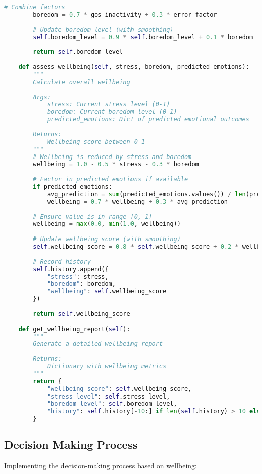 \documentclass[11pt,a4paper]{article}
\begin{document}
\begin{lstlisting}[language=Python]
        # Combine factors
        boredom = 0.7 * gos_inactivity + 0.3 * error_factor
        
        # Update boredom level (with smoothing)
        self.boredom_level = 0.9 * self.boredom_level + 0.1 * boredom
        
        return self.boredom_level
        
    def assess_wellbeing(self, stress, boredom, predicted_emotions):
        """
        Calculate overall wellbeing
        
        Args:
            stress: Current stress level (0-1)
            boredom: Current boredom level (0-1)
            predicted_emotions: Dict of predicted emotional outcomes
            
        Returns:
            Wellbeing score between 0-1
        """
        # Wellbeing is reduced by stress and boredom
        wellbeing = 1.0 - 0.5 * stress - 0.3 * boredom
        
        # Factor in predicted emotions if available
        if predicted_emotions:
            avg_prediction = sum(predicted_emotions.values()) / len(predicted_emotions)
            wellbeing = 0.7 * wellbeing + 0.3 * avg_prediction
            
        # Ensure value is in range [0, 1]
        wellbeing = max(0.0, min(1.0, wellbeing))
        
        # Update wellbeing score (with smoothing)
        self.wellbeing_score = 0.8 * self.wellbeing_score + 0.2 * wellbeing
        
        # Record history
        self.history.append({
            "stress": stress,
            "boredom": boredom,
            "wellbeing": self.wellbeing_score
        })
        
        return self.wellbeing_score
        
    def get_wellbeing_report(self):
        """
        Generate a detailed wellbeing report
        
        Returns:
            Dictionary with wellbeing metrics
        """
        return {
            "wellbeing_score": self.wellbeing_score,
            "stress_level": self.stress_level,
            "boredom_level": self.boredom_level,
            "history": self.history[-10:] if len(self.history) > 10 else self.history
        }
\end{lstlisting}

\subsection{Decision Making Process}
Implementing the decision-making process based on wellbeing:
\end{document}
